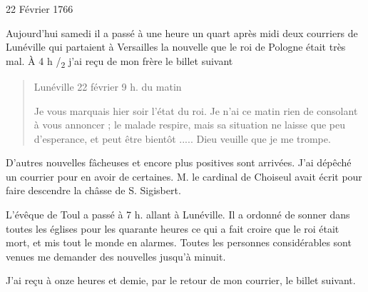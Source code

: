                      \begin{diary}{22 Février 1766}{}

                         Aujourd'hui samedi il a passé à une
                           heure
                           un quart après midi deux courriers de
                           Lunéville qui
                           partaient à Versailles la
                           nouvelle
                           que le roi de Pologne était très mal. À 4 h /\textsubscript{2}
                           j'ai reçu de mon frère le billet
                           suivant \bigskip


                        \begin{quote}\begin{flushright}Lunéville
                              22 février 9 h. du matin\end{flushright}
                              Je vous marquais hier soir l'état du roi. Je
                              n'ai ce matin rien de consolant à vous
                              annoncer ; le malade respire, mais sa
                              situation ne laisse que peu d'esperance, et
                              peut être bientôt ..... Dieu veuille que je me trompe. \bigskip

        \end{quote}
                         D'autres nouvelles fâcheuses et encore
                           plus
                           positives sont arrivées. J'ai dépêché un
                           courrier pour en avoir de certaines. M.
                              le cardinal de Choiseul avait écrit pour
                           faire descendre la châsse de S.
                           Sigisbert.
                        \bigskip



                           L'évêque de Toul a passé à 7 h.
                           allant
                           à Lunéville. Il a ordonné
                           de sonner dans
                           toutes les églises pour les quarante heures
                           ce qui a fait croire que le
                              roi était mort,
                           et mis tout le monde en alarmes. Toutes
                           les personnes considérables sont venues me
                           demander des nouvelles jusqu'à minuit. \bigskip


                         J'ai reçu à onze heures et demie, par le
                           retour de mon courrier, le billet suivant. \bigskip



\end{diary}
